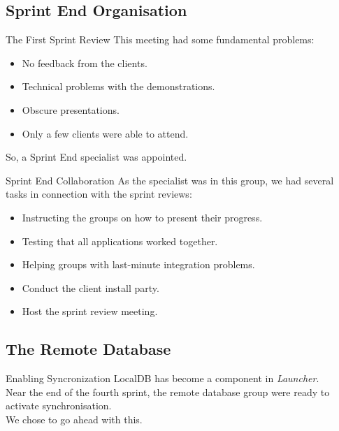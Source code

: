 \subsection{Sprint End Organisation}

\begin{frame}{The First Sprint Review}
	This meeting had some fundamental problems:
	\begin{itemize}
		\item No feedback from the clients.
		\item Technical problems with the demonstrations.
		\item Obscure presentations.
		\item Only a few clients were able to attend.
	\end{itemize}
	So, a Sprint End specialist was appointed.
\end{frame}

\begin{frame}{Sprint End Collaboration}
	As the specialist was in this group, we had several tasks in connection with the sprint reviews:
	\begin{itemize}
		\item<1> Instructing the groups on how to present their progress.
		\item<2> Testing that all applications worked together.
		\item<3> Helping groups with last-minute integration problems.
		\item<4> Conduct the client install party.
		\item<5> Host the sprint review meeting.
	\end{itemize}
\end{frame}


\subsection{The Remote Database}

\begin{frame}{Enabling Syncronization}
	LocalDB has become a component in \textit{Launcher}.\\
	\vspace{\baselineskip}
	Near the end of the fourth sprint, the remote database group were ready to activate synchronisation.\\
	\vspace{\baselineskip}
	We chose to go ahead with this.
\end{frame}

